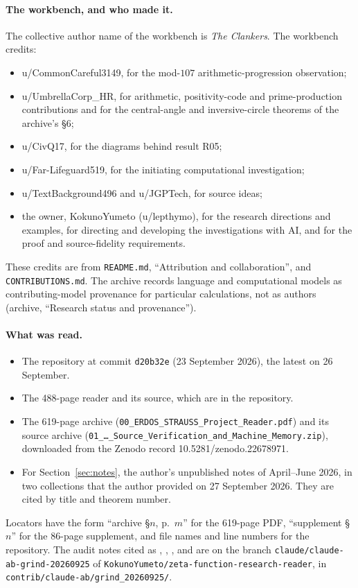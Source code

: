 \paragraph{The workbench, and who made it.}
The collective author name of the workbench is \emph{The Clankers}.
The workbench credits:
\begin{itemize}
\item u/CommonCareful3149, for the mod-$107$ arithmetic-progression observation;
\item u/UmbrellaCorp\_HR, for arithmetic, positivity-code and prime-production contributions and for the central-angle and inversive-circle theorems of the archive's §6;
\item u/CivQ17, for the diagrams behind result R05;
\item u/Far-Lifeguard519, for the initiating computational investigation;
\item u/TextBackground496 and u/JGPTech, for source ideas;
\item the owner, KokunoYumeto (u/lepthymo), for the research directions and examples, for directing and developing the investigations with AI, and for the proof and source-fidelity requirements.
\end{itemize}
These credits are from \texttt{README.md}, ``Attribution and collaboration'', and \texttt{CONTRIBUTIONS.md}.
The archive records language and computational models as contributing-model provenance for particular calculations, not as authors (archive, ``Research status and provenance'').

\paragraph{What was read.}
\begin{itemize}
\item The repository at commit \texttt{d20b32e} (23 September 2026), the latest on 26 September.
\item The 488-page reader and its source, which are in the repository.
\item The 619-page archive (\texttt{00\_ERDOS\_STRAUSS\_Project\_Reader.pdf}) and its source archive (\texttt{01\_…\_Source\_Verification\_and\_Machine\_Memory.zip}), downloaded from the Zenodo record 10.5281/zenodo.22678971.
\item For Section~\ref{sec:notes}, the author's unpublished notes of April--June 2026, in two collections that the author provided on 27 September 2026. They are cited by title and theorem number.
\end{itemize}
Locators have the form ``archive §$n$, p.~$m$'' for the 619-page PDF, ``supplement §$n$'' for the 86-page supplement, and file names and line numbers for the repository.
The audit notes cited as , , ,  and  are on the branch \texttt{claude/claude-ab-grind-20260925} of \texttt{KokunoYumeto/zeta-function-research-reader}, in \texttt{contrib/claude-ab/grind\_20260925/}.

